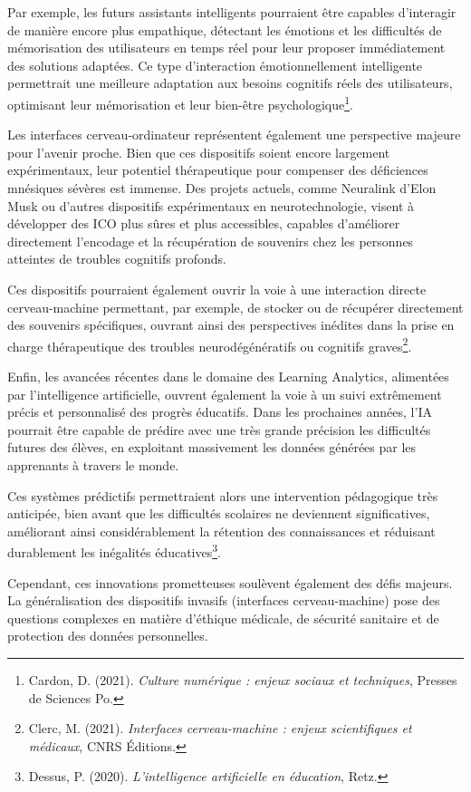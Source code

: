 \documentclass[11pt,a4paper]{report}
\begin{document}
Par exemple, les futurs assistants intelligents pourraient être capables d’interagir de manière encore plus empathique, détectant les émotions et les difficultés de mémorisation des utilisateurs en temps réel pour leur proposer immédiatement des solutions adaptées. Ce type d’interaction émotionnellement intelligente permettrait une meilleure adaptation aux besoins cognitifs réels des utilisateurs, optimisant leur mémorisation et leur bien-être psychologique\footnote{Cardon, D. (2021). \textit{Culture numérique : enjeux sociaux et techniques}, Presses de Sciences Po.}.

Les interfaces cerveau-ordinateur représentent également une perspective majeure pour l’avenir proche. Bien que ces dispositifs soient encore largement expérimentaux, leur potentiel thérapeutique pour compenser des déficiences mnésiques sévères est immense. Des projets actuels, comme Neuralink d’Elon Musk ou d’autres dispositifs expérimentaux en neurotechnologie, visent à développer des ICO plus sûres et plus accessibles, capables d’améliorer directement l’encodage et la récupération de souvenirs chez les personnes atteintes de troubles cognitifs profonds.

Ces dispositifs pourraient également ouvrir la voie à une interaction directe cerveau-machine permettant, par exemple, de stocker ou de récupérer directement des souvenirs spécifiques, ouvrant ainsi des perspectives inédites dans la prise en charge thérapeutique des troubles neurodégénératifs ou cognitifs graves\footnote{Clerc, M. (2021). \textit{Interfaces cerveau-machine : enjeux scientifiques et médicaux}, CNRS Éditions.}.

Enfin, les avancées récentes dans le domaine des Learning Analytics, alimentées par l’intelligence artificielle, ouvrent également la voie à un suivi extrêmement précis et personnalisé des progrès éducatifs. Dans les prochaines années, l’IA pourrait être capable de prédire avec une très grande précision les difficultés futures des élèves, en exploitant massivement les données générées par les apprenants à travers le monde.

Ces systèmes prédictifs permettraient alors une intervention pédagogique très anticipée, bien avant que les difficultés scolaires ne deviennent significatives, améliorant ainsi considérablement la rétention des connaissances et réduisant durablement les inégalités éducatives\footnote{Dessus, P. (2020). \textit{L’intelligence artificielle en éducation}, Retz.}.

Cependant, ces innovations prometteuses soulèvent également des défis majeurs. La généralisation des dispositifs invasifs (interfaces cerveau-machine) pose des questions complexes en matière d’éthique médicale, de sécurité sanitaire et de protection des données personnelles.
\end{document}
